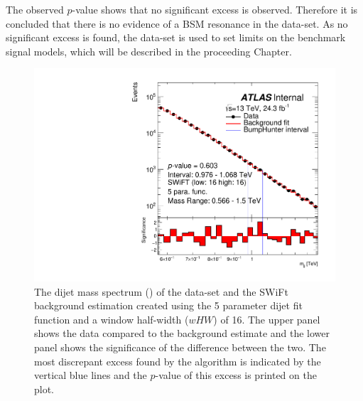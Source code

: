The observed \bh{} $p$-value shows that no significant excess is observed.
Therefore it is concluded that there is no evidence of a BSM resonance in the \lm{} data-set.
As no significant excess is found, the \lm{} data-set is used to set limits on the benchmark signal models,
which will be described in the proceeding Chapter.

\begin{figure}[!thb]
\captionsetup[subfigure]{aboveskip=0pt,justification=centering}
\centering
  \includegraphics[width=0.7\linewidth, angle=0]{figs/Dibjet/LowMass/FitStudy_min566/bhFit_unblind_5para_low16_high16.pdf}
\vspace{3pt}
\caption[The dijet mass spectrum (\mjj) of the \lm{} data-set and the SWiFt background estimation
  created using the 5 parameter dijet fit function and a window half-width ($wHW$) of 16.
  The most discrepant excess found by the \bh{} algorithm and the \mbox{$p$-value} of this excess are indicated on the plot.]
        {\label{fig:bhFit_lm_unblind}
   The dijet mass spectrum (\mjj) of the \lm{} data-set and the SWiFt background estimation
   created using the 5 parameter dijet fit function and a window half-width ($wHW$) of 16. 
   The upper panel shows the data compared to the background estimate and the lower panel shows the significance of the difference between the two.
   The most discrepant excess found by the \bh{} algorithm is indicated by the vertical blue lines and the \mbox{$p$-value} of this excess is printed on the plot. }
\end{figure}




